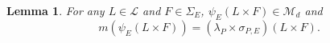 \documentclass[11pt]{article}
\newtheorem{lemma}[theorem]{Lemma}
\newtheorem{remark}{Remark}
\begin{document}
\begin{comment}\textcolor{blue}{\begin{remark}
Huan, the analogous result to the following lemma is in the first paragraph on Page 281 of \cite{Stein2005} and is in the sentence preceding ``So we have established (10) for all measurable rectangles..." Truthfully, I don't follow their argument and, actually, I don't quite believe it. When checking it, you should verify carefully the claims made in the first few sentences.
\end{remark}}
\end{comment}
\begin{lemma}\label{lem:AllMeasurableRectangles} For any $L\in\mathcal{L}$ and $F\in \Sigma_E$, $\psi_E(L\times F)\in\mathcal{M}_d$ and 
\begin{equation*}
m(\psi_E(L\times F))=(\lambda_P\times\sigma_{P,E})(L\times F).
\end{equation*}
\end{lemma}
\end{document}
